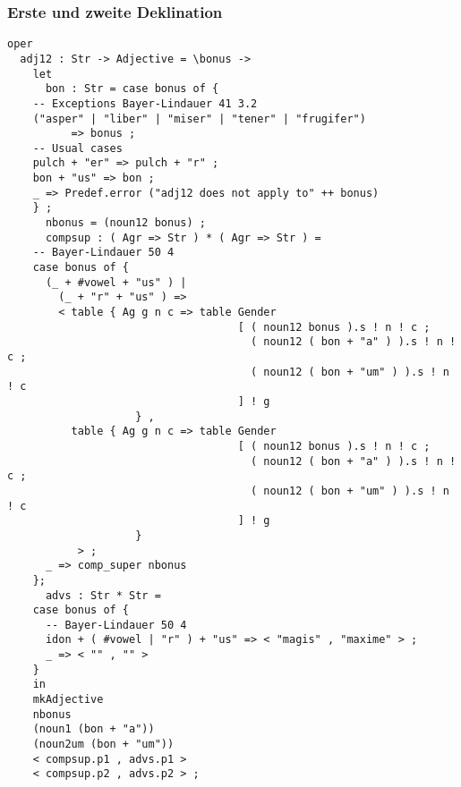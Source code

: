 \subsubsection{Erste und zweite Deklination}
\begin{lstlisting}[float=h!tp,caption={Deklinationsfunktion für drei-endige Adjektive der ersten und zweiten Deklination (vgl. \textbf{MorphoLat.gf})},label={GF-Morpho-Adj12},basicstyle=\small]
oper
  adj12 : Str -> Adjective = \bonus ->
    let
      bon : Str = case bonus of {
	-- Exceptions Bayer-Lindauer 41 3.2
	("asper" | "liber" | "miser" | "tener" | "frugifer") 
          => bonus ;
	-- Usual cases
	pulch + "er" => pulch + "r" ;
	bon + "us" => bon ;
	_ => Predef.error ("adj12 does not apply to" ++ bonus)
	} ; 
      nbonus = (noun12 bonus) ;
      compsup : ( Agr => Str ) * ( Agr => Str ) = 
	-- Bayer-Lindauer 50 4
	case bonus of {
	  (_ + #vowel + "us" ) |
	    (_ + "r" + "us" ) => 
	    < table { Ag g n c => table Gender 
                                    [ ( noun12 bonus ).s ! n ! c ; 
                                      ( noun12 ( bon + "a" ) ).s ! n ! c ; 
                                      ( noun12 ( bon + "um" ) ).s ! n ! c 
                                    ] ! g 
                    } ,
	      table { Ag g n c => table Gender 
                                    [ ( noun12 bonus ).s ! n ! c ; 
                                      ( noun12 ( bon + "a" ) ).s ! n ! c ; 
                                      ( noun12 ( bon + "um" ) ).s ! n ! c 
                                    ] ! g 
                    } 
           > ;
	  _ => comp_super nbonus
	};
      advs : Str * Str = 
	case bonus of {
	  -- Bayer-Lindauer 50 4
	  idon + ( #vowel | "r" ) + "us" => < "magis" , "maxime" > ;
	  _ => < "" , "" >
	}
    in
    mkAdjective 
    nbonus 
    (noun1 (bon + "a")) 
    (noun2um (bon + "um")) 
    < compsup.p1 , advs.p1 > 
    < compsup.p2 , advs.p2 > ;
\end{lstlisting}
